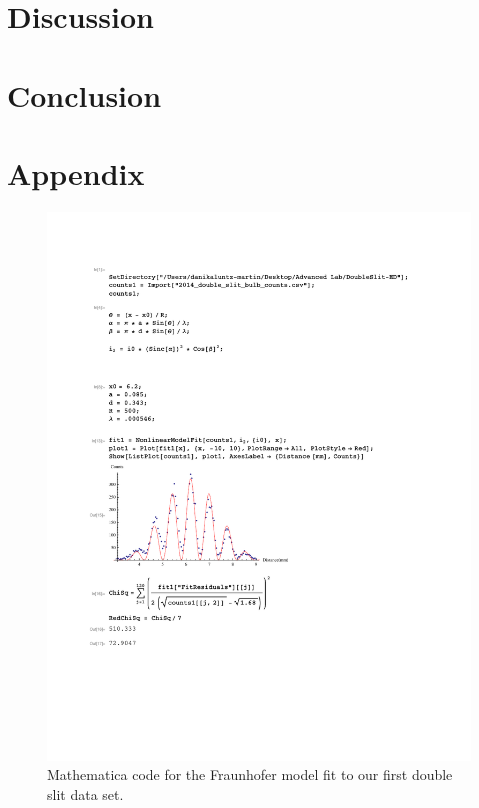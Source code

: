 \documentclass[prb,preprint]{revtex4-1}
\begin{document}
\section{Discussion}


\section{Conclusion}

\section{Appendix}

\begin{figure}[h!]
\centering
\includegraphics[width=6in]{DoubleSlitFraun1.pdf}
\caption{Mathematica code for the Fraunhofer model fit to our first double slit data set.}
\label{DoubleSlitFraun1}
\end{figure}
\end{document}
